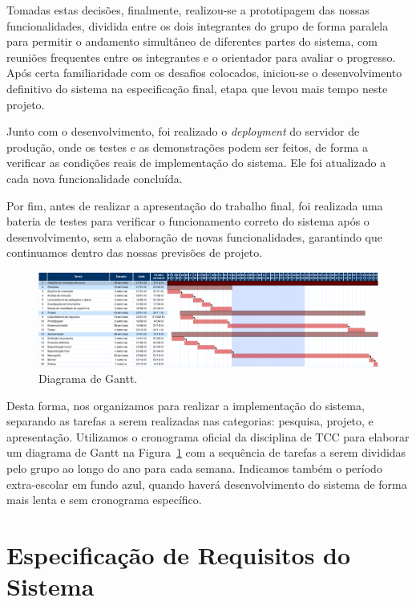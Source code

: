 \documentclass[]{politex}
\begin{document}
Tomadas estas decisões, finalmente, realizou-se a prototipagem das nossas
funcionalidades, dividida entre os dois integrantes do grupo de forma paralela
para permitir o andamento simultâneo de diferentes partes do sistema, com reuniões
frequentes entre os integrantes e o orientador para avaliar o progresso. Após
certa familiaridade com os desafios colocados, iniciou-se o desenvolvimento definitivo do sistema na
especificação final, etapa que levou mais tempo neste projeto.

Junto com o desenvolvimento, foi realizado o \textit{deployment} do servidor de produção,
onde os testes e as demonstrações podem ser feitos, de forma a verificar as
condições reais de implementação do sistema. Ele foi atualizado a cada nova
funcionalidade concluída.

Por fim, antes de realizar a apresentação do trabalho final, foi realizada uma
bateria de testes para verificar o funcionamento correto do sistema após o
desenvolvimento, sem a elaboração de novas funcionalidades, garantindo que
continuamos dentro das nossas previsões de projeto.

\begin{figure}[H]
    \centering
    \includegraphics[width=6.5in]{imagens/diagrama_gantt}
    \caption{Diagrama de Gantt.}
    \label{fig:gantt}
\end{figure}

Desta forma, nos organizamos para realizar a implementação do sistema, separando
as tarefas a serem realizadas nas categorias: pesquisa, projeto, e apresentação.
Utilizamos o cronograma oficial da disciplina de TCC para elaborar um diagrama de Gantt na
Figura~\ref{fig:gantt} com a sequência de tarefas a serem divididas pelo grupo
ao longo do ano para cada semana. Indicamos também o período extra-escolar em
fundo azul, quando haverá desenvolvimento do sistema de forma mais lenta e
sem cronograma específico.

\chapter{Especificação de Requisitos do Sistema}
\end{document}
